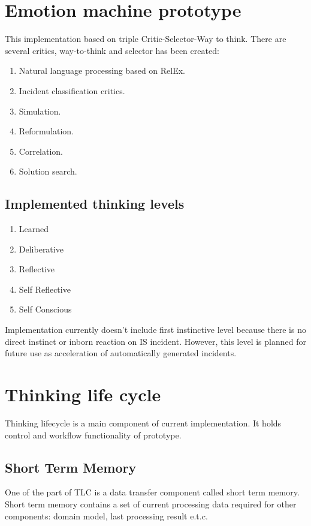 \documentclass{llncs}
\begin{document}
\section{Emotion machine prototype}
This implementation based on triple Critic-Selector-Way to think. There are several critics, way-to-think and selector has been created:

\begin{enumerate}
 \item Natural language processing based on RelEx.
 \item Incident classification critics.
 \item Simulation.
 \item Reformulation.
 \item Correlation.
 \item Solution search.
\end{enumerate}

\subsection{Implemented thinking levels}

\begin{enumerate}
 \item Learned
 \item Deliberative
 \item Reflective
 \item Self Reflective
 \item Self Conscious
\end{enumerate}

Implementation currently doesn’t include first instinctive level because there is no direct instinct or inborn reaction on IS incident. However, this level is planned for future use as acceleration of automatically generated incidents.

\section{Thinking life cycle}

Thinking lifecycle is a main component of current implementation. It holds control and workflow functionality of prototype. 

\subsection{Short Term Memory}
One of the part of TLC is a data transfer component called short term memory. Short term memory contains a set of current processing data required for other components: domain model, last processing result e.t.c.
\end{document}
